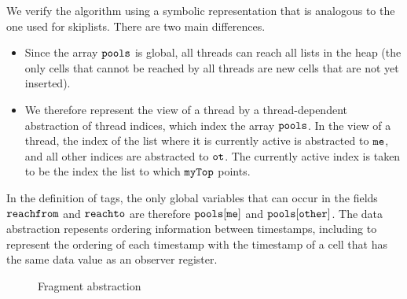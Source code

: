 We verify the algorithm using a symbolic representation that is analogous
to the one used for skiplists. There are two main differences.
\begin{itemize}
\item
  Since the array $\tt pools$ is global, all threads can reach all lists in
  the heap (the only cells that cannot be reached by all threads are
  new cells that are not yet inserted).
\item
  We therefore represent the view of a thread by a thread-dependent abstraction
  of thread indices, which index the array $\tt pools$. In the view of
  a thread, the index of the list where it is currently active
  is abstracted to $\tt me$, and all other
  indices are abstracted to $\tt ot$. The currently active index is taken to
  be the index the list to which $\tt myTop$ points.
\end{itemize}
In the definition of tags, the only global variables that can occur in
the fields $\mathtt{reachfrom}$ and $\mathtt{reachto}$ are therefore
$\tt pools[me]$ and $\tt pools[other]$. The data abstraction repesents
ordering information between timestamps, including to represent the ordering
of each timestamp with the timestamp of a cell that has the same data value
as an observer register.

\begin{figure}
	
\caption{Fragment abstraction}
\label{fig:tsviewshape}
\end{figure} 

